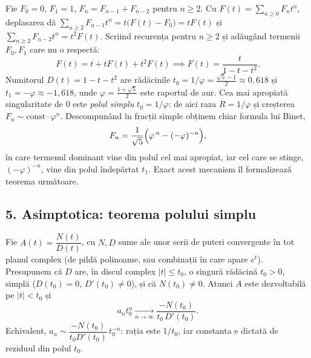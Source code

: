 \begin{exemplu}
Fie $F_0=0$, $F_1=1$, $F_n=F_{n-1}+F_{n-2}$ pentru $n\ge2$. Cu $F(t)=\sum_{n\ge0}F_nt^n$, deplasarea dă $\sum_{n\ge2}F_{n-1}t^n=t\bigl(F(t)-F_0\bigr)=tF(t)$ și $\sum_{n\ge2}F_{n-2}t^n=t^2F(t)$. Scriind recurența pentru $n\ge2$ și adăugând termenii $F_0,F_1$ care nu o respectă:
\[
F(t)=t+tF(t)+t^2F(t)\implies F(t)=\frac{t}{1-t-t^2}.
\]
Numitorul $D(t)=1-t-t^2$ are rădăcinile $t_0=1/\varphi=\frac{\sqrt5-1}{2}\approx0{,}618$ și $t_1=-\varphi\approx-1{,}618$, unde $\varphi=\frac{1+\sqrt5}{2}$ este raportul de aur. Cea mai apropiată singularitate de $0$ este \emph{polul simplu} $t_0=1/\varphi$: de aici raza $R=1/\varphi$ și creșterea $F_n\sim\text{const}\cdot\varphi^n$. Descompunând în fracții simple obținem chiar formula lui Binet,
\[
F_n=\frac{1}{\sqrt5}\Bigl(\varphi^{\,n}-(-\varphi)^{-n}\Bigr),
\]
în care termenul dominant vine din polul cel mai apropiat, iar cel care se stinge, $(-\varphi)^{-n}$, vine din polul îndepărtat $t_1$. Exact acest mecanism îl formalizează teorema următoare.
\end{exemplu}

\subsection*{5. Asimptotica: teorema polului simplu}

\begin{teorema}
Fie $A(t)=\dfrac{N(t)}{D(t)}$, cu $N,D$ sume ale unor serii de puteri convergente în tot planul complex (de pildă polinoame, sau combinații în care apare $e^t$). Presupunem că $D$ are, în discul complex $|t|\le t_0$, o singură rădăcină $t_0>0$, simplă ($D(t_0)=0$, $D'(t_0)\neq0$), și că $N(t_0)\neq0$. Atunci $A$ este dezvoltabilă pe $|t|<t_0$ și
\[
a_nt_0^n\xrightarrow[n\to\infty]{}\frac{-N(t_0)}{t_0\,D'(t_0)}.
\]
Echivalent, $a_n\sim\dfrac{-N(t_0)}{t_0D'(t_0)}\,t_0^{-n}$: rația este $1/t_0$, iar constanta e dictată de reziduul din polul $t_0$.
\end{teorema}

